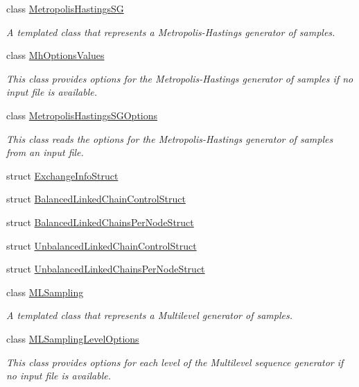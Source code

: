 \begin{DoxyCompactItemize}
class \hyperlink{class_q_u_e_s_o_1_1_metropolis_hastings_s_g}{Metropolis\-Hastings\-S\-G}
\begin{DoxyCompactList}\small\item\em A templated class that represents a Metropolis-\/\-Hastings generator of samples. \end{DoxyCompactList}\item 
class \hyperlink{class_q_u_e_s_o_1_1_mh_options_values}{Mh\-Options\-Values}
\begin{DoxyCompactList}\small\item\em This class provides options for the Metropolis-\/\-Hastings generator of samples if no input file is available. \end{DoxyCompactList}\item 
class \hyperlink{class_q_u_e_s_o_1_1_metropolis_hastings_s_g_options}{Metropolis\-Hastings\-S\-G\-Options}
\begin{DoxyCompactList}\small\item\em This class reads the options for the Metropolis-\/\-Hastings generator of samples from an input file. \end{DoxyCompactList}\item 
struct \hyperlink{struct_q_u_e_s_o_1_1_exchange_info_struct}{Exchange\-Info\-Struct}
\item 
struct \hyperlink{struct_q_u_e_s_o_1_1_balanced_linked_chain_control_struct}{Balanced\-Linked\-Chain\-Control\-Struct}
\item 
struct \hyperlink{struct_q_u_e_s_o_1_1_balanced_linked_chains_per_node_struct}{Balanced\-Linked\-Chains\-Per\-Node\-Struct}
\item 
struct \hyperlink{struct_q_u_e_s_o_1_1_unbalanced_linked_chain_control_struct}{Unbalanced\-Linked\-Chain\-Control\-Struct}
\item 
struct \hyperlink{struct_q_u_e_s_o_1_1_unbalanced_linked_chains_per_node_struct}{Unbalanced\-Linked\-Chains\-Per\-Node\-Struct}
\item 
class \hyperlink{class_q_u_e_s_o_1_1_m_l_sampling}{M\-L\-Sampling}
\begin{DoxyCompactList}\small\item\em A templated class that represents a Multilevel generator of samples. \end{DoxyCompactList}\item 
class \hyperlink{class_q_u_e_s_o_1_1_m_l_sampling_level_options}{M\-L\-Sampling\-Level\-Options}
\begin{DoxyCompactList}\small\item\em This class provides options for each level of the Multilevel sequence generator if no input file is available. \end{DoxyCompactList}\item 

\end{DoxyCompactItemize}
